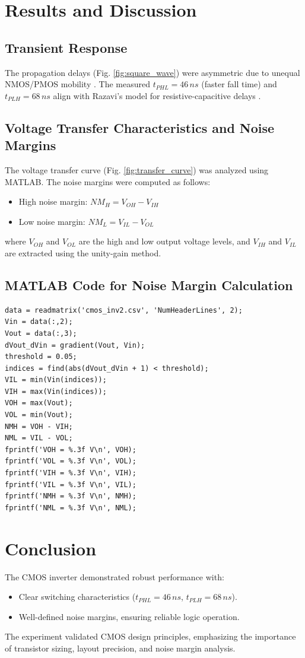 \documentclass[9pt,conference]{IEEEtran}
\begin{document}
\section{Results and Discussion}
\subsection{Transient Response}
The propagation delays (Fig. \ref{fig:square_wave}) were asymmetric due to unequal NMOS/PMOS mobility \cite{1}. The measured \(t_{PHL} = 46\,ns\) (faster fall time) and \(t_{PLH} = 68\,ns\) align with Razavi's model for resistive-capacitive delays \cite{1}.

\subsection{Voltage Transfer Characteristics and Noise Margins}
The voltage transfer curve (Fig. \ref{fig:transfer_curve}) was analyzed using MATLAB. The noise margins were computed as follows:
\begin{itemize}
    \item High noise margin: \(NM_H = V_{OH} - V_{IH}\)
    \item Low noise margin: \(NM_L = V_{IL} - V_{OL}\)
\end{itemize}
where \(V_{OH}\) and \(V_{OL}\) are the high and low output voltage levels, and \(V_{IH}\) and \(V_{IL}\) are extracted using the unity-gain method.

\subsection{MATLAB Code for Noise Margin Calculation}
\begin{verbatim}
data = readmatrix('cmos_inv2.csv', 'NumHeaderLines', 2);
Vin = data(:,2);
Vout = data(:,3);
dVout_dVin = gradient(Vout, Vin);
threshold = 0.05;
indices = find(abs(dVout_dVin + 1) < threshold);
VIL = min(Vin(indices));
VIH = max(Vin(indices));
VOH = max(Vout);
VOL = min(Vout);
NMH = VOH - VIH;
NML = VIL - VOL;
fprintf('VOH = %.3f V\n', VOH);
fprintf('VOL = %.3f V\n', VOL);
fprintf('VIH = %.3f V\n', VIH);
fprintf('VIL = %.3f V\n', VIL);
fprintf('NMH = %.3f V\n', NMH);
fprintf('NML = %.3f V\n', NML);
\end{verbatim}

\section{Conclusion}
The CMOS inverter demonstrated robust performance with:
\begin{itemize}
    \item Clear switching characteristics (\(t_{PHL} = 46\,ns\), \(t_{PLH} = 68\,ns\)).
    \item Well-defined noise margins, ensuring reliable logic operation.
\end{itemize}
The experiment validated CMOS design principles, emphasizing the importance of transistor sizing, layout precision, and noise margin analysis.
\end{document}
